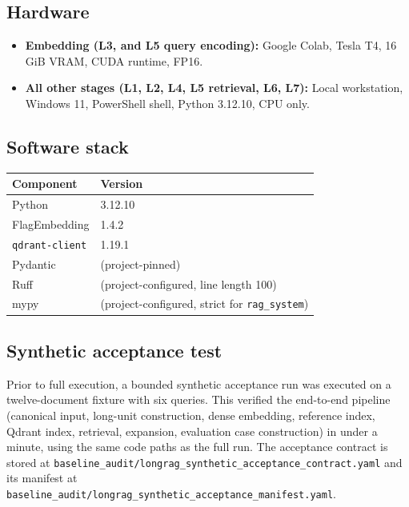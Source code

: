 \documentclass[11pt,a4paper]{article}
\begin{document}
\subsection{Hardware}
\begin{itemize}[leftmargin=1.5em,itemsep=0.15em]
  \item \textbf{Embedding (L3, and L5 query encoding):}
    Google Colab, Tesla T4, 16\,GiB VRAM, CUDA runtime, FP16.
  \item \textbf{All other stages (L1, L2, L4, L5 retrieval, L6, L7):}
    Local workstation, Windows 11, PowerShell shell,
    Python 3.12.10, CPU only.
\end{itemize}

\subsection{Software stack}
\begin{center}
\begin{tabular}{l l}
\toprule
\textbf{Component} & \textbf{Version} \\
\midrule
Python               & 3.12.10 \\
FlagEmbedding        & 1.4.2 \\
\texttt{qdrant-client} & 1.19.1 \\
Pydantic             & (project-pinned) \\
Ruff                 & (project-configured, line length 100) \\
mypy                 & (project-configured, strict for \texttt{rag\_system}) \\
\bottomrule
\end{tabular}
\end{center}

\subsection{Synthetic acceptance test}
\label{sec:synthetic}
Prior to full execution, a bounded synthetic acceptance run was
executed on a twelve-document fixture with six queries. This
verified the end-to-end pipeline (canonical input,
long-unit construction, dense embedding, reference index, Qdrant
index, retrieval, expansion, evaluation case construction) in
under a minute, using the same code paths as the full run. The
acceptance contract is stored at
\texttt{baseline\_audit/longrag\_synthetic\_acceptance\_contract.yaml}
and its manifest at
\texttt{baseline\_audit/longrag\_synthetic\_acceptance\_manifest.yaml}.
\end{document}
